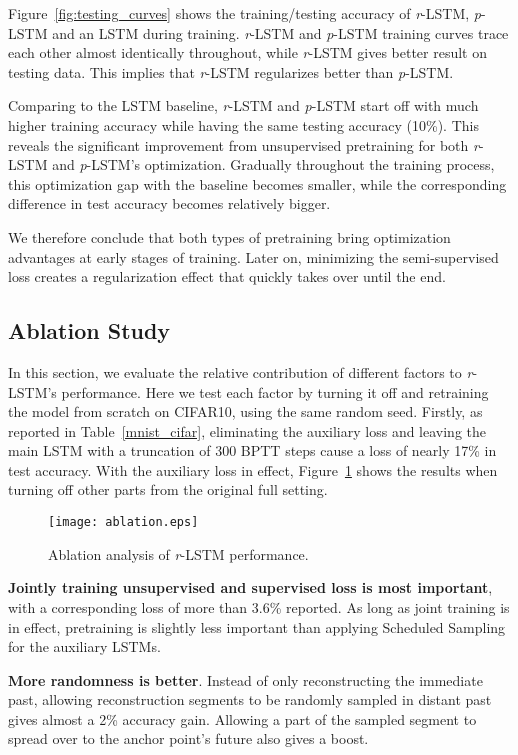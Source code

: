 \documentclass{article}
\newcommand{\rlstm}{{\it r}-LSTM}
\newcommand{\plstm}{{\it p}-LSTM}
\begin{document}
Figure~\ref{fig:testing_curves} shows the training/testing accuracy of \rlstm{}, \plstm{} and an LSTM during training. \rlstm{} and \plstm{} training curves trace each other almost identically throughout, while \rlstm{} gives better result on testing data. This implies that \rlstm{} regularizes better than \plstm{}.


Comparing to the LSTM baseline, \rlstm{} and \plstm{} start off with much higher training accuracy while having the same testing accuracy (10\%). This reveals the significant improvement from unsupervised pretraining for both \rlstm{} and \plstm{}'s optimization. Gradually throughout the training process, this optimization gap with the baseline becomes smaller, while the corresponding difference in test accuracy becomes relatively bigger.

We therefore conclude that both types of pretraining bring optimization advantages at early stages of training. Later on, minimizing the semi-supervised loss creates a regularization effect that quickly takes over until the end.

\subsection{Ablation Study}

In this section, we evaluate the relative contribution of different factors to \rlstm{}'s performance. Here we test each factor by turning it off and retraining the model from scratch on CIFAR10, using the same random seed. Firstly, as reported in Table~\ref{mnist_cifar}, eliminating the auxiliary loss and leaving the main LSTM with a truncation of 300 BPTT steps cause a loss of nearly 17\% in test accuracy. With the auxiliary loss in effect, Figure~\ref{fig:ablation} shows the results when turning off other parts from the original full setting.

\begin{figure}[htb]
\texttt{[image: ablation.eps]}
\caption{Ablation analysis of \rlstm{} performance.}
\label{fig:ablation}
\end{figure}


\textbf{Jointly training unsupervised and supervised loss is most important}, with a corresponding loss of more than 3.6\% reported. As long as joint training is in effect, pretraining is slightly less important than applying Scheduled Sampling for the auxiliary LSTMs.

\textbf{More randomness is better}. Instead of only reconstructing the immediate past, allowing reconstruction segments to be randomly sampled in distant past gives almost a 2\% accuracy gain. Allowing a part of the sampled segment to spread over to the anchor point's future also gives a boost.
\end{document}
